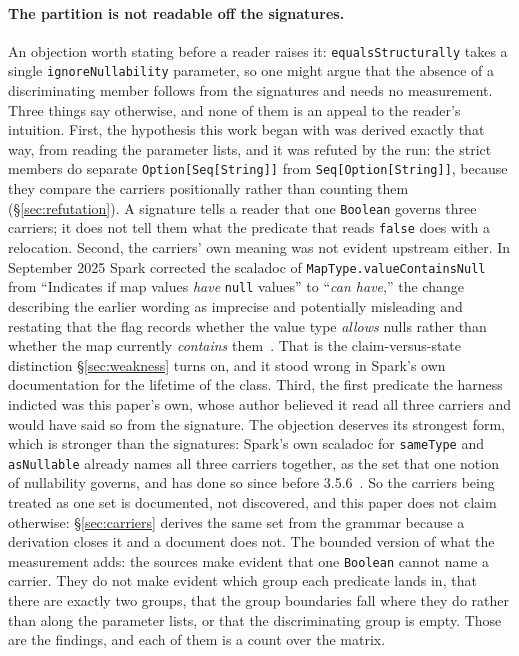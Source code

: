 \paragraph{The partition is not readable off the signatures.} An objection worth stating before a reader raises it: \texttt{equalsStructurally} takes a single \texttt{ignoreNullability} parameter, so one might argue that the absence of a discriminating member follows from the signatures and needs no measurement. Three things say otherwise, and none of them is an appeal to the reader's intuition. First, the hypothesis this work began with was derived exactly that way, from reading the parameter lists, and it was refuted by the run: the strict members do separate \texttt{Option[Seq[String]]} from \texttt{Seq[Option[String]]}, because they compare the carriers positionally rather than counting them (\S\ref{sec:refutation}). A signature tells a reader that one \texttt{Boolean} governs three carriers; it does not tell them what the predicate that reads \texttt{false} does with a relocation. Second, the carriers' own meaning was not evident upstream either. In September 2025 Spark corrected the scaladoc of \texttt{MapType.valueContainsNull} from ``Indicates if map values \emph{have} \texttt{null} values'' to ``\emph{can have},'' the change describing the earlier wording as imprecise and potentially misleading and restating that the flag records whether the value type \emph{allows} nulls rather than whether the map currently \emph{contains} them~\cite{spark_53717}. That is the claim-versus-state distinction \S\ref{sec:weakness} turns on, and it stood wrong in Spark's own documentation for the lifetime of the class. Third, the first predicate the harness indicted was this paper's own, whose author believed it read all three carriers and would have said so from the signature. The objection deserves its strongest form, which is stronger than the signatures: Spark's own scaladoc for \texttt{sameType} and \texttt{asNullable} already names all three carriers together, as the set that one notion of nullability governs, and has done so since before 3.5.6~\cite{spark_source_datatype}. So the carriers being treated as one set is documented, not discovered, and this paper does not claim otherwise: \S\ref{sec:carriers} derives the same set from the grammar because a derivation closes it and a document does not. The bounded version of what the measurement adds: the sources make evident that one \texttt{Boolean} cannot name a carrier. They do not make evident which group each predicate lands in, that there are exactly two groups, that the group boundaries fall where they do rather than along the parameter lists, or that the discriminating group is empty. Those are the findings, and each of them is a count over the matrix.

